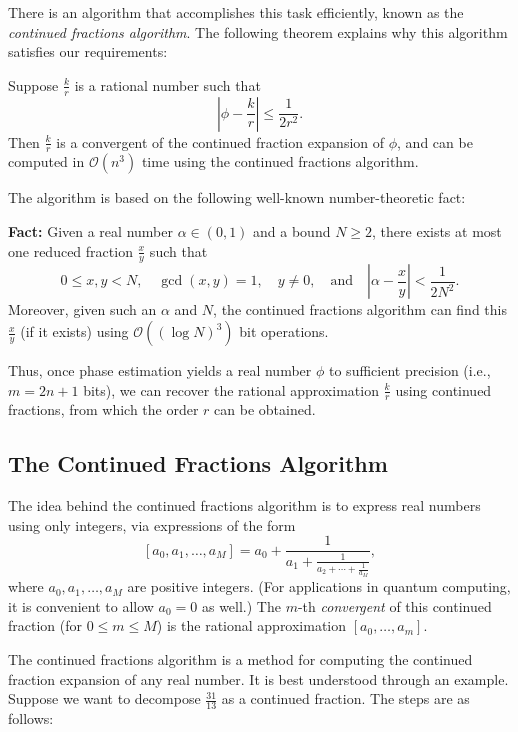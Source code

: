 There is an algorithm that accomplishes this task efficiently, known as the \textit{continued fractions algorithm}. The following theorem explains why this algorithm satisfies our requirements:

\begin{theorem}
    Suppose $\frac{k}{r}$ is a rational number such that
    \[
    \left| \phi - \frac{k}{r} \right| \leq \frac{1}{2r^2}.
    \]
    Then $\frac{k}{r}$ is a convergent of the continued fraction expansion of $\phi$, and can be computed in $\mathcal{O}(n^3)$ time using the continued fractions algorithm.
\end{theorem}

The algorithm is based on the following well-known number-theoretic fact:

\textbf{Fact:}
    Given a real number $\alpha \in (0,1)$ and a bound $N \geq 2$, there exists at most one reduced fraction $\frac{x}{y}$ such that
    \[
    0 \leq x, y < N,\quad \gcd(x,y) = 1,\quad y \neq 0,\quad \text{and} \quad \left| \alpha - \frac{x}{y} \right| < \frac{1}{2N^2}.
    \]
    Moreover, given such an $\alpha$ and $N$, the continued fractions algorithm can find this $\frac{x}{y}$ (if it exists) using $\mathcal{O}((\log N)^3)$ bit operations.
    
Thus, once phase estimation yields a real number $\phi$ to sufficient precision (i.e., $m = 2n+1$ bits), we can recover the rational approximation $\frac{k}{r}$ using continued fractions, from which the order $r$ can be obtained.

\subsection{The Continued Fractions Algorithm}

The idea behind the continued fractions algorithm is to express real numbers using only integers, via expressions of the form
\[
[a_0, a_1, \ldots, a_M] = a_0 + \frac{1}{a_1 + \frac{1}{a_2 + \cdots + \frac{1}{a_M}}},
\]
where $a_0, a_1, \ldots, a_M$ are positive integers. (For applications in quantum computing, it is convenient to allow $a_0 = 0$ as well.) The $m$-th \textit{convergent} of this continued fraction (for $0 \leq m \leq M$) is the rational approximation $[a_0, \ldots, a_m]$.

The continued fractions algorithm is a method for computing the continued fraction expansion of any real number. It is best understood through an example. Suppose we want to decompose $\frac{31}{13}$ as a continued fraction. The steps are as follows:

